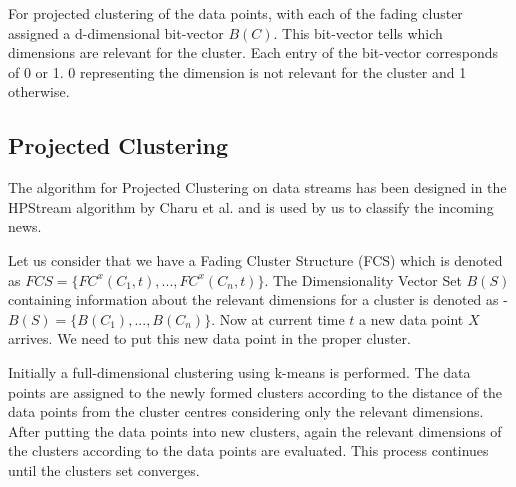 \documentclass[review,twocolumn,5p]{elsarticle}
\begin{document}
For projected clustering of the data points, with each of the fading cluster assigned a d-dimensional bit-vector $B(C)$. This bit-vector tells which dimensions are relevant for the cluster. Each entry of the bit-vector corresponds of 0 or 1. 0 representing the dimension is not relevant for the cluster and 1 otherwise. 

\subsection{Projected Clustering}
\label{sec:proj_clustering}
The algorithm for Projected Clustering on data streams has been designed in the HPStream algorithm by Charu et al. \cite{Aggarwal:2005} and is used by us to classify the incoming news.

Let us consider that we have a Fading Cluster Structure (FCS) which is denoted as $FCS = \{ FC^x(C_1, t), ... , FC^x(C_n, t)\}$. The Dimensionality Vector Set $B(S)$ containing information about the relevant dimensions for a cluster is denoted as - $B(S) = \{ B(C_1), ... , B(C_n)\}$. Now at current time $t$ a new data point $X$ arrives. We need to put this new data point in the proper cluster. 

Initially a full-dimensional clustering using k-means is performed. The data points are assigned to the newly formed clusters according to the distance of the data points from the cluster centres considering only the relevant dimensions. After putting the data points into new clusters, again the relevant dimensions of the clusters according to the data points are evaluated. This process continues until the clusters set converges. 
\end{document}
